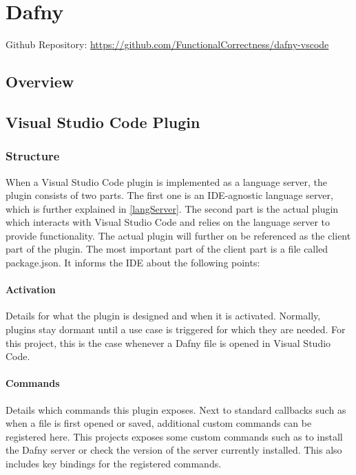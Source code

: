 \section{Dafny}


Github Repository: \href{https://github.com/FunctionalCorrectness/dafny-vscode}{https://github.com/FunctionalCorrectness/dafny-vscode}

\subsection{Overview}

\subsection{Visual Studio Code Plugin}
\subsubsection{Structure}
When a Visual Studio Code plugin is implemented as a language server, the plugin consists of two parts. The first one is an IDE-agnostic language server, which is further explained in \ref{langServer}. The second part is the actual plugin which interacts with Visual Studio Code and relies on the language server to provide functionality. \newline
The actual plugin will further on be referenced as the client part of the plugin. The most important part of the client part is a file called package.json. It informs the IDE about the following points:
\paragraph{Activation}
Details for what the plugin is designed and when it is activated. Normally, plugins stay dormant until a use case is triggered for which they are needed. For this project, this is the case whenever a Dafny file is opened in Visual Studio Code.

\paragraph{Commands}
Details which commands this plugin exposes. Next to standard callbacks such as when a file is first opened or saved, additional custom commands can be registered here. This projects exposes some custom commands such as to install the Dafny server or check the version of the server currently installed. This also includes key bindings for the registered commands.

